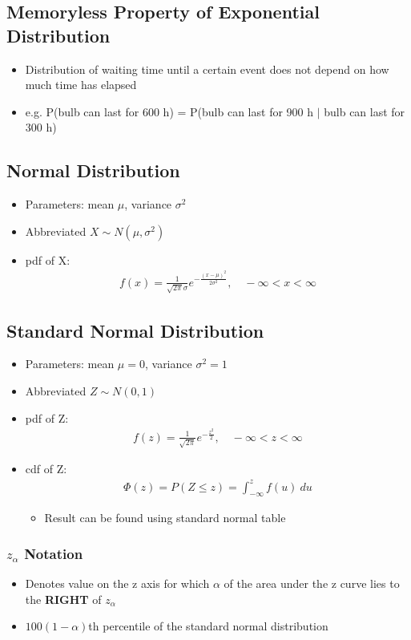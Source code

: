 \documentclass[a4paper]{article}
\begin{document}
\subsection{Memoryless Property of Exponential Distribution}
\begin{itemize}
    \item Distribution of waiting time until a certain event does not depend on how much time has elapsed
    \item e.g. P(bulb can last for 600 h) = P(bulb can last for 900 h $|$ bulb can last for 300 h)
\end{itemize}
\subsection{Normal Distribution}
\begin{itemize}
    \item Parameters: mean $\mu$, variance $\sigma^{2}$
    \item Abbreviated $X \sim N(\mu, \sigma^{2})$
    \item pdf of X:
    \begin{align*}
        f(x) = \frac{1}{\sqrt{2\pi}\sigma}e^{-\frac{(x-\mu)^{2}}{2\sigma^{2}}}, \quad-\infty<x<\infty
    \end{align*}
\end{itemize}
\subsection{Standard Normal Distribution}
\begin{itemize}
    \item Parameters: mean $\mu = 0$, variance $\sigma^{2} = 1$
    \item Abbreviated $Z \sim N(0, 1)$
    \item pdf of Z:
    \begin{align*}
        f(z) = \frac{1}{\sqrt{2\pi}}e^{-\frac{z^2}{2}}, \quad-\infty<z<\infty
    \end{align*}
    \item cdf of Z:
    \begin{align*}
        \Phi(z) = P(Z\leq z) = \int_{-\infty}^{z}f(u) \ du
    \end{align*}
    \begin{itemize}
        \item Result can be found using standard normal table
    \end{itemize}
\end{itemize}
\subsubsection{\texorpdfstring{$z_{\alpha}$}{za} Notation}
\begin{itemize}
    \item Denotes value on the z axis for which $\alpha$ of the area under the z curve lies to the \textbf{RIGHT} of $z_{\alpha}$
    \item $100(1-\alpha)$th percentile of the standard normal distribution
\end{itemize}
\end{document}
